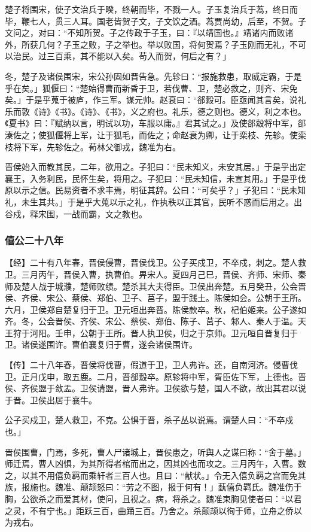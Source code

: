 \documentclass[]{article}
\begin{document}
楚子将围宋，使子文治兵于睽，终朝而毕，不戮一人。子玉复治兵于蒍，终日而毕，鞭七人，贯三人耳。国老皆贺子文，子文饮之酒。蒍贾尚幼，后至，不贺。子文问之，对曰：``不知所贺。子之传政于子玉，曰：『以靖国也。』靖诸内而败诸外，所获几何？子玉之败，子之举也。举以败国，将何贺焉？子玉刚而无礼，不可以治民。过三百乘，其不能以入矣。苟入而贺，何后之有？」

冬，楚子及诸侯围宋，宋公孙固如晋告急。先轸曰：``报施救患，取威定霸，于是乎在矣。」狐偃曰：``楚始得曹而新昏于卫，若伐曹、卫，楚必救之，则齐、宋免矣。」于是乎蒐于被庐，作三军。谋元帅。赵衰曰：``郤縠可。臣亟闻其言矣，说礼乐而敦《诗》《书》。《诗》、《书》，义之府也。礼乐，德之则也。德义，利之本也。《夏书》曰：『赋纳以言，明试以功，车服以庸。』君其试之。」及使郤縠将中军，郤溱佐之；使狐偃将上军，让于狐毛，而佐之；命赵衰为卿，让于栾枝、先轸。使栾枝将下军，先轸佐之。荀林父御戎，魏准为右。

晋侯始入而教其民，二年，欲用之。子犯曰：``民未知义，未安其居。」于是乎出定襄王，入务利民，民怀生矣，将用之。子犯曰：``民未知信，未宣其用。」于是乎伐原以示之信。民易资者不求丰焉，明征其辞。公曰：``可矣乎？」子犯曰：``民未知礼，未生其共。」于是乎大蒐以示之礼，作执秩以正其官，民听不惑而后用之。出谷戍，释宋围，一战而霸，文之教也。

\hypertarget{header-n961}{%
\subsubsection{僖公二十八年}\label{header-n961}}

【经】二十有八年春，晋侯侵曹，晋侯伐卫。公子买戍卫，不卒戍，刺之。楚人救卫。三月丙午，晋侯入曹，执曹伯。畀宋人。夏四月己巳，晋侯、齐师、宋师、秦师及楚人战于城濮，楚师败绩。楚杀其大夫得臣。卫侯出奔楚。五月癸丑，公会晋侯、齐侯、宋公、蔡侯、郑伯、卫子、莒子，盟于践土。陈侯如会。公朝于王所。六月，卫侯郑自楚复归于卫。卫元咺出奔晋。陈侯款卒。秋，杞伯姬来。公子遂如齐。冬，公会晋侯、齐侯、宋公、蔡侯、郑伯、陈子、莒子、邾人、秦人于温。天王狩于河阳。壬申，公朝于王所。晋人执卫侯，归之于京师。卫元咺自晋复归于卫。诸侯遂围许。曹伯襄复归于曹，遂会诸侯围许。

【传】二十八年春，晋侯将伐曹，假道于卫，卫人弗许。还，自南河济。侵曹伐卫。正月戊申，取五鹿。二月，晋郤縠卒。原轸将中军，胥臣佐下军，上德也。晋侯、齐侯盟于敛盂。卫侯请盟，晋人弗许。卫侯欲与楚，国人不欲，故出其君以说于晋。卫侯出居于襄牛。

公子买戍卫，楚人救卫，不克。公惧于晋，杀子丛以说焉。谓楚人曰：``不卒戍也。」

晋侯围曹，门焉，多死，曹人尸诸城上，晋侯患之，听舆人之谋曰称：``舍于墓。」师迁焉，曹人凶惧，为其所得者棺而出之，因其凶也而攻之。三月丙午，入曹。数之，以其不用僖负羁而乘轩者三百人也。且曰：``献状。」令无入僖负羁之宫而免其族，报施也。魏准、颠颉怒曰：``劳之不图，报于何有！」蓺僖负羁氏。魏准伤于胸，公欲杀之而爱其材，使问，且视之。病，将杀之。魏准束胸见使者曰：``以君之灵，不有宁也。」距跃三百，曲踊三百。乃舍之。杀颠颉以徇于师，立舟之侨以为戎右。
\end{document}
